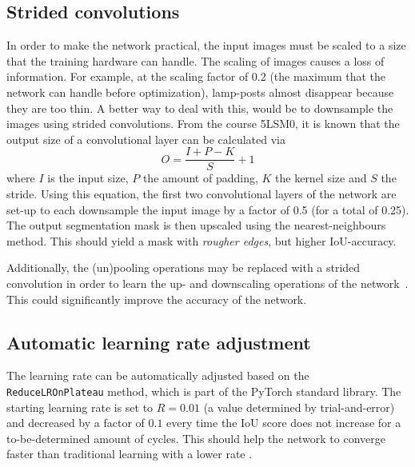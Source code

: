 \subsection{Strided convolutions}
In order to make the network practical, the input images must be scaled to a size that the training hardware can handle. The scaling of images causes a loss of information. For example, at the scaling factor of 0.2 (the maximum that the network can handle before optimization), lamp-posts almost disappear because they are too thin.
A better way to deal with this, would be to downsample the images using strided convolutions. 
From the course 5LSM0, it is known that the output size of a convolutional layer can be calculated via \begin{equation}
O = \frac{I+P-K}{S} + 1
\end{equation}
where $I$ is the input size, $P$ the amount of padding, $K$ the kernel size and $S$ the stride. 
Using this equation, the first two convolutional layers of the network are set-up to each downsample the input image by a factor of 0.5 (for a total of 0.25). The output segmentation mask is then upscaled using the nearest-neighbours method. This should yield a mask with \textit{rougher edges}, but higher IoU-accuracy.

Additionally, the (un)pooling operations may be replaced with a strided convolution in order to learn the up- and downscaling operations of the network~\cite{springenberg2014striving}. This could significantly improve the accuracy of the network. 

\subsection{Automatic learning rate adjustment}
The learning rate can be automatically adjusted based on the \texttt{ReduceLROnPlateau} method, which is part of the PyTorch standard library. The starting learning rate is set to $R=0.01$ (a value determined by trial-and-error) and decreased by a factor of $0.1$ every time the IoU score does not increase for a to-be-determined amount of cycles. This should help the network to converge faster than traditional learning with a lower rate \cite{DBLP:journals/corr/abs-1708-07120}.
